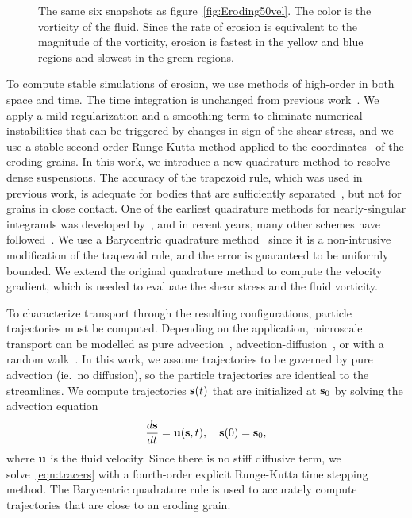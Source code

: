 \documentclass{jfm}
\begin{document}
\begin{figure}
\begin{center}
\caption{\label{fig:Eroding50vort} The same six snapshots as
figure~\ref{fig:Eroding50vel}.  The color is the vorticity of the fluid.
Since the rate of erosion is equivalent to the magnitude of the
vorticity, erosion is fastest in the yellow and blue regions and slowest
in the green regions.}
\end{center}
\end{figure}

To compute stable simulations of erosion, we use methods of high-order
in both space and time. The time integration is unchanged from previous
work~\citep{qua-moo2018}.  We apply a mild regularization and a
smoothing term to eliminate numerical instabilities that can be
triggered by changes in sign of the shear stress, and we use a stable
second-order Runge-Kutta method applied to the {\thL}
coordinates~\citep{hou-low-she1994} of the eroding grains.  In this
work, we introduce a new quadrature method to resolve dense suspensions.
The accuracy of the trapezoid rule, which was used in previous work, is
adequate for bodies that are sufficiently separated~\citep{tre-wei2014},
but not for grains in close contact.  One of the earliest quadrature
methods for nearly-singular integrands was developed
by~\citet{bak-she1986}, and in recent years, many other schemes have
followed~\citep{kli-tor2018, hel-oja2008a, bea-yin-wil2016, bea-lai2001,
klo-bar-gre-one2013}.  We use a Barycentric quadrature
method~\citep{bar2014, bar-wu-vee2015} since it is a non-intrusive
modification of the trapezoid rule, and the error is guaranteed to be
uniformly bounded.  We extend the original quadrature method to compute
the velocity gradient, which is needed to evaluate the shear stress and
the fluid vorticity.

To characterize transport through the resulting configurations, particle
trajectories must be computed. Depending on the application, microscale
transport can be modelled as pure advection~\citep{dea-qua-bir-jua2018,
cve-che-wen1996, puy-gou-den2019},
advection-diffusion~\citep{cus-hu-den1995, dag1987, den-ica-hid2018}, or
with a random walk~\citep{saf1959, bij-blu2006, ber-sch-sil2000}.  In
this work, we assume trajectories to be governed by pure advection
(ie.~no diffusion), so the particle trajectories are identical to the
streamlines. We compute trajectories $\ss(t)$ that are initialized at
$\ss_0$ by solving the advection equation
\begin{align}
  \frac{d\ss}{dt} = \uu(\ss,t), \quad \ss(0) = \ss_0,
  \label{eqn:tracers}
\end{align}
where $\uu$ is the fluid velocity.  Since there is no stiff diffusive
term, we solve~\eqref{eqn:tracers} with a fourth-order explicit
Runge-Kutta time stepping method. The Barycentric quadrature rule is
used to accurately compute trajectories that are close to an eroding
grain. 
\end{document}
